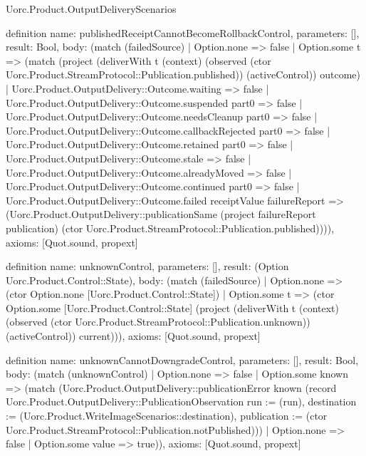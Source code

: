 \begin{lexlean}{Uorc.Product.OutputDeliveryScenarios}
\begin{semanticmodule}
definition{
  name: publishedReceiptCannotBecomeRollbackControl,
  parameters: [],
  result: Bool,
  body: (match (failedSource)
    | Option.none => false
    | Option.some t => (match (project (deliverWith t (context) (observed (ctor Uorc.Product.StreamProtocol::Publication.published)) (activeControl)) outcome)
      | Uorc.Product.OutputDelivery::Outcome.waiting => false
      | Uorc.Product.OutputDelivery::Outcome.suspended part0 => false
      | Uorc.Product.OutputDelivery::Outcome.needsCleanup part0 => false
      | Uorc.Product.OutputDelivery::Outcome.callbackRejected part0 => false
      | Uorc.Product.OutputDelivery::Outcome.retained part0 => false
      | Uorc.Product.OutputDelivery::Outcome.stale => false
      | Uorc.Product.OutputDelivery::Outcome.alreadyMoved => false
      | Uorc.Product.OutputDelivery::Outcome.continued part0 => false
      | Uorc.Product.OutputDelivery::Outcome.failed receiptValue failureReport => (Uorc.Product.OutputDelivery::publicationSame (project failureReport publication) (ctor Uorc.Product.StreamProtocol::Publication.published)))),
  axioms: [Quot.sound, propext]
}

definition{
  name: unknownControl,
  parameters: [],
  result: (Option Uorc.Product.Control::State),
  body: (match (failedSource)
    | Option.none => (ctor Option.none [Uorc.Product.Control::State])
    | Option.some t => (ctor Option.some [Uorc.Product.Control::State] (project (deliverWith t (context) (observed (ctor Uorc.Product.StreamProtocol::Publication.unknown)) (activeControl)) current))),
  axioms: [Quot.sound, propext]
}

definition{
  name: unknownCannotDowngradeControl,
  parameters: [],
  result: Bool,
  body: (match (unknownControl)
    | Option.none => false
    | Option.some known => (match (Uorc.Product.OutputDelivery::publicationError known (record Uorc.Product.OutputDelivery::PublicationObservation {run := (run), destination := (Uorc.Product.WriteImageScenarios::destination), publication := (ctor Uorc.Product.StreamProtocol::Publication.notPublished)}))
      | Option.none => false
      | Option.some value => true)),
  axioms: [Quot.sound, propext]
}


\end{semanticmodule}
\end{lexlean}
